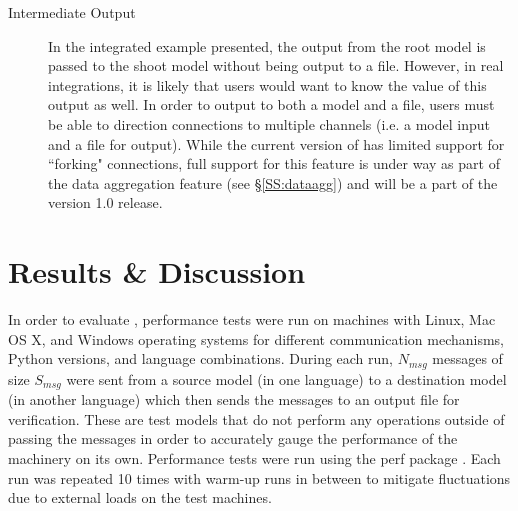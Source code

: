 \documentclass[journal]{IEEEtran}
\newcommand{\todo}[1]{{\color{red}{#1}}}
\newcommand{\pkg}{{\tt \todo{cis\_interface}}{}}
\begin{document}
\begin{description}
\item[Intermediate Output] In the integrated example presented, the output from the root model is passed to the shoot model without being output to a file. However, in real integrations, it is likely that users would want to know the value of this output as well. In order to output to both a model and a file, users must be able to direction connections to multiple channels (i.e. a model input and a file for output). While the current version of {\pkg} has limited support for ``forking" connections, full support for this feature is under way as part of the data aggregation feature (see \S\ref{SS:dataagg}) and will be a part of the version 1.0 release.
\end{description}


\section{Results \& Discussion}\label{S:results}
%
In order to evaluate {\pkg}, performance tests were run on machines with Linux, Mac OS X, and Windows operating systems for different communication mechanisms, Python versions, and language combinations. During each run, $N_{msg}$ messages of size $S_{msg}$ were sent from a source model (in one language) to a destination model (in another language) which then sends the messages to an output file for verification. These are test models that do not perform any operations outside of passing the messages in order to accurately gauge the performance of the {\pkg} machinery on its own. Performance tests were run using the perf package \citep{Stinner2018}. Each run was repeated 10 times with warm-up runs in between to mitigate fluctuations due to external loads on the test machines.

\end{document}
